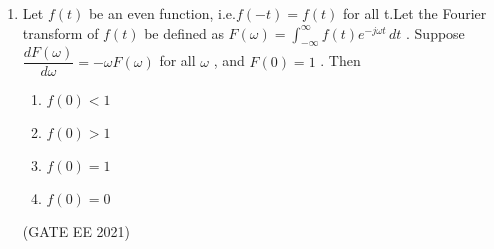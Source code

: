 \begin{enumerate}[label=\thechapter.\arabic*,ref=\thechapter.\theenumi]
\item Let $f(t)$ be an even function, i.e.$f(-t) = f(t)$ for all t.Let the Fourier transform of $f(t)$ be defined as $F(\omega) = \int_{-\infty}^{\infty} f(t) e^{-j \omega t} \, dt $ . Suppose $\dfrac{dF(\omega)}{d \omega} = -\omega F(\omega)$ for all $\omega$ , and $F(0) = 1$ . Then


\begin{enumerate}[label = (\Alph*)]
\item $f(0) < 1 $\\
\item  $f(0) > 1 $\\
\item  $f(0) = 1 $\\
\item   $f(0) = 0 $\\
\end{enumerate} \hfill{(GATE EE 2021)}\\
\solution

\pagebreak
\end{enumerate}

